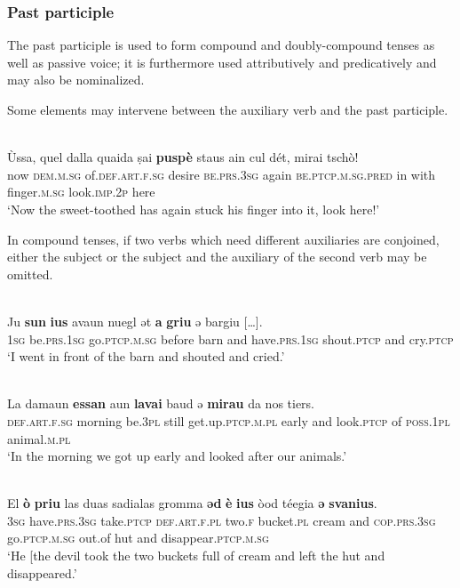 \subsubsection{Past participle}
The past participle is used to form compound and doubly-compound tenses as well as passive voice; it is furthermore used attributively and predicatively and may also be nominalized. 

Some elements may intervene between the auxiliary verb and the past participle.

\ea\label{}
\\
\gll Ùssa, quel dalla quaida ṣai \textbf{puspè} staus ain cul dét, mirai tschò!\\
   now \textsc{dem.m.sg} of.\textsc{def.art.f.sg} desire \textsc{be.prs.3sg} again \textsc{be.ptcp.m.sg.pred} in with finger.\textsc{m.sg} look.\textsc{imp.2p} here\\
\glt `Now the sweet-toothed has again stuck his finger into it, look here!'
\z


In compound tenses, if two verbs which need different auxiliaries are conjoined, either the subject or the subject and the auxiliary of the second verb may be omitted.

\ea\label{}
 {\citealt[69]{Büchli1966}}\\
\gll Ju \textbf{sun} \textbf{ius} avaun nuegl ət \textbf{a} \textbf{griu} ə bargiu […].\\
     \textsc{1sg}  be.\textsc{prs.1sg}  go.\textsc{ptcp.m.sg} before barn and have.\textsc{prs.1sg} shout.\textsc{ptcp} and cry.\textsc{ptcp}\\
\glt `I went in front of the barn and shouted and cried.'
\z


\ea\label{}
 {\citealt[68]{Büchli1966}}\\
\gll La damaun \textbf{essan} aun \textbf{lavai} baud ə \textbf{mirau} da nos tiers.\\
     \textsc{def.art.f.sg}  morning be.\textsc{3pl} still get.up.\textsc{ptcp.m.pl}  early and look.\textsc{ptcp} of \textsc{poss.1pl} animal.\textsc{m.pl}\\
\glt `In the morning we got up early and looked after our animals.'
\z

\ea\label{}
\\
\gll El \textbf{ò} \textbf{priu} las duas sadialas gromma \textbf{ǝd} \textbf{è} \textbf{ius} òod téegia \textbf{ǝ} \textbf{svanius}.\\
    \textsc{3sg}  have.\textsc{prs.3sg} take.\textsc{ptcp} \textsc{def.art.f.pl} two.\textsc{f} bucket.\textsc{pl}  cream and \textsc{cop.prs.3sg} go.\textsc{ptcp.m.sg} out.of hut and disappear.\textsc{ptcp.m.sg}\\
\glt `He [the devil took the two buckets full of cream and left the hut and disappeared.'
\z

